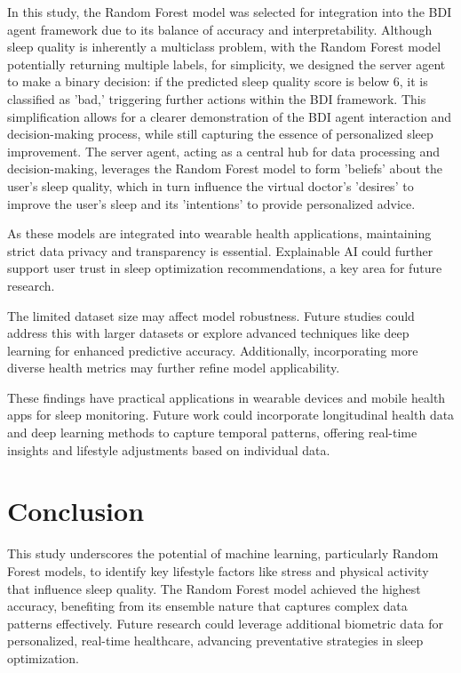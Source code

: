 \documentclass[conference]{IEEEtran}
\begin{document}
In this study, the Random Forest model was selected for integration into the BDI agent framework due to its balance of accuracy and interpretability. Although sleep quality is inherently a multiclass problem, with the Random Forest model potentially returning multiple labels, for simplicity, we designed the server agent to make a binary decision: if the predicted sleep quality score is below 6, it is classified as 'bad,' triggering further actions within the BDI framework. This simplification allows for a clearer demonstration of the BDI agent interaction and decision-making process, while still capturing the essence of personalized sleep improvement. The server agent, acting as a central hub for data processing and decision-making, leverages the Random Forest model to form 'beliefs' about the user's sleep quality, which in turn influence the virtual doctor's 'desires' to improve the user's sleep and its 'intentions' to provide personalized advice. 

As these models are integrated into wearable health applications, maintaining strict data privacy and transparency is essential. Explainable AI could further support user trust in sleep optimization recommendations, a key area for future research.

The limited dataset size may affect model robustness. Future studies could address this with larger datasets or explore advanced techniques like deep learning for enhanced predictive accuracy. Additionally, incorporating more diverse health metrics may further refine model applicability.

These findings have practical applications in wearable devices and mobile health apps for sleep monitoring. Future work could incorporate longitudinal health data and deep learning methods to capture temporal patterns, offering real-time insights and lifestyle adjustments based on individual data.

\section{Conclusion}
This study underscores the potential of machine learning, particularly Random Forest models, to identify key lifestyle factors like stress and physical activity that influence sleep quality. The Random Forest model achieved the highest accuracy, benefiting from its ensemble nature that captures complex data patterns effectively. Future research could leverage additional biometric data for personalized, real-time healthcare, advancing preventative strategies in sleep optimization.
\end{document}
